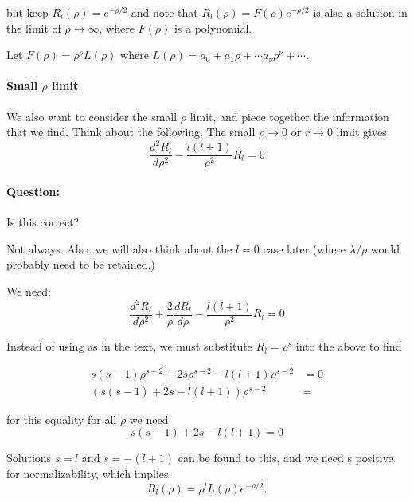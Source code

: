 but keep \(R_l(\rho) = e^{-\rho/2}\) and note that \(R_l(\rho) = F(\rho)e^{-\rho/2}\) is also a solution in the limit of \(\rho \rightarrow \infty\), where \(F(\rho)\) is a polynomial.

Let \(F(\rho) = \rho^s L(\rho)\) where \(L(\rho) = a_0 + a_1 \rho + \cdots a_\nu \rho^\nu + \cdots\).

\paragraph{Small \(\rho\) limit}

We also want to consider the small \(\rho\) limit, and piece together the information that we find.  Think about the following.  The small \(\rho \rightarrow 0\) or \(r \rightarrow 0\) limit gives
%
\begin{equation}\label{eqn:PHY356FLecture10:140}
\frac{d^2 R_l}{d\rho^2} - \frac{l(l+1)}{\rho^2} R_l = 0
\end{equation}

\paragraph{Question:} Is this correct?

Not always.  Also: we will also think about the \(l=0\) case later (where \(\lambda/\rho\) would probably need to be retained.)

We need:
\begin{equation}\label{eqn:PHY356FLecture10:140b}
\frac{d^2 R_l}{d\rho^2} + \frac{2}{\rho} \frac{d R_l}{d\rho} - \frac{l(l+1)}{\rho^2} R_l = 0
\end{equation}

Instead of using  as in the text, we must substitute \(R_l = \rho^s\) into the above to find

\begin{align}\label{eqn:PHY356FLecture10:150}
s(s-1) \rho^{s-2} + 2 s \rho^{s-2} - l(l+1) \rho^{s-2} &= 0 \\
\left( s(s-1) + 2 s - l(l+1) \right) \rho^{s-2} &=
\end{align}

for this equality for all \(\rho\) we need
%
\begin{equation}\label{eqn:PHY356FLecture10:160}
s(s-1) + 2 s - l(l+1) = 0
\end{equation}

Solutions \(s = l\) and \(s = -(l+1)\) can be found to this, and we need s positive for normalizability, which implies
%
\begin{equation}\label{eqn:PHY356FLecture10:170}
R_l(\rho) = \rho^l L(\rho) e^{-\rho/2}.
\end{equation}

